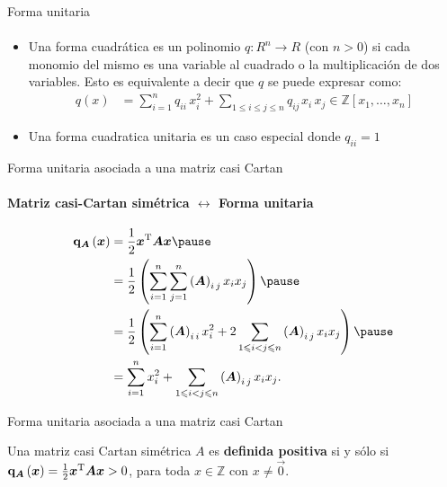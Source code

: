 \documentclass[spanish]{beamer}
\begin{document}
\begin{frame}{Forma unitaria}
  \framesubtitle{}{}
  \begin{itemize}
  \item Una forma cuadrática es un polinomio $q : R^{n} \rightarrow
R$ (con $n > 0$) si cada monomio del mismo es una variable al cuadrado o la multiplicación de dos variables. Esto es equivalente a decir que $q$ se puede expresar como:
	\begin{align*}
    q\left(x\right) &=  \sum_{i=1}^{n}q_{ii}\,x_{i}^{2} + \sum_{1 \leq i \leq j \leq n}q_{ij\,}x_{i}\,x_{j} \in \mathbb{Z}[x_{1}, \ldots, x_{n}]
  \end{align*}
  \item Una forma cuadratica unitaria es un caso especial donde $q_{ii}=1$
  \end{itemize}
\end{frame}

\begin{frame}{Forma unitaria asociada a una matriz casi Cartan}
  \framesubtitle{Matriz casi-Cartan simétrica $\leftrightarrow$ Forma unitaria}
  \begin{align*}
    \Quadratic{\mat{A}}\left(\vec{x}\right) &= \frac{1}{2} 
    \transpose{\vec{x}} \mat{A} \vec{x}  \pause \\
    &= \frac{1}{2} \left( \sum_{i = 1}^{n} \sum_{j = 1}^{n} 
      \entry{\mat{A}}{i}{j} x_i x_j \right) \pause \\
    &= \frac{1}{2} \left(\sum_{i=1}^{n} \entry{\mat{A}}{i}{i} x_i^2
       + 2 \sum_{1 \le i < j \le n} \entry{\mat{A}}{i}{j} x_i x_j\right)  
       \pause \\
    &= \sum_{i=1}^{n} x_i^2 + \sum_{1 \le i < j \le n} \entry{\mat{A}}{i}{j}    
       x_i x_j \text{.}
  \end{align*}
\end{frame}

\begin{frame}{Forma unitaria asociada a una matriz casi Cartan}
  \begin{definition}
  Una matriz casi Cartan simétrica $A$ es \textbf{definida positiva} si y sólo si 
  $\mathbf{q}_{\boldsymbol{A}}\left(\boldsymbol{x}\right) = \frac{1}{2} {\boldsymbol{x}}^{\operatorname{T}} \boldsymbol{A} \boldsymbol{x}>0$, para toda $x\in \mathbb{Z}$ con $x\neq \vec{0}$.
  \end{definition}
\end{frame}
\end{document}
